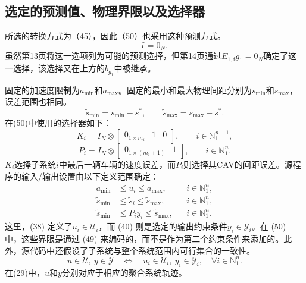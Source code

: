 \documentclass{article}
\begin{document}
\subsection*{选定的预测值、物理界限以及选择器}
所选的转换方式为（45），因此（50）也采用这种预测方式。
\begin{equation}
\hat\epsilon=0_N. \tag{37}
\end{equation}
虽然第13页将这一选项列为可能的预测选择，但第14页通过$E_{1,\mathrm f}g_1=0_N$确定了这一选择，该选择又在上方的$b_{g_1}$中被继承。

固定的加速度限制为$a_{\min}$和$a_{\max}$。固定的最小和最大物理间距分别为$s_{\min}$和$s_{\max}$，误差范围也相同。
\[
\tilde{s}_{\min}=s_{\min}-s^*,\qquad
\tilde{s}_{\max}=s_{\max}-s^*.
\]
在(50)中使用的选择器如下：
\[
K_i=I_N\otimes\begin{bmatrix}0_{1\times m_i}&1&0\end{bmatrix},
\qquad i\in\mathbb N_1^{n-1},
\]
\[
P_i=I_N\otimes\begin{bmatrix}0_{1\times(m_i+1)}&1\end{bmatrix},
\qquad i\in\mathbb N_1^n.
\]
$K_i$选择子系统$i$中最后一辆车辆的速度误差，而$P_i$则选择其CAV的间距误差。源程序的输入/输出设置由以下定义范围确定：
\begin{align}
a_{\min}&\leq u_i\leq a_{\max}, &&i\in\mathbb N_1^n, \tag{38}\\
\tilde{s}_{\min}&\leq\tilde{s}_i\leq\tilde{s}_{\max}, &&i\in\mathbb N_1^n, \tag{39}\\
\tilde{s}_{\min}&\leq P_i y_i\leq\tilde{s}_{\max}, &&i\in\mathbb N_1^n. \tag{40}
\end{align}
这里，(38) 定义了$u_i\in\mathcal U_i$，而 (40) 则是选定的输出约束条件$y_i\in\mathcal Y_i$。在 (50) 中，这些界限是通过 (49) 来编码的，而不是作为第二个约束条件来添加的。此外，源代码中还假设了子系统与整个系统范围内可行集合的一致性。
\begin{equation}
u\in\mathcal U,\ y\in\mathcal Y
\quad\Longleftrightarrow\quad
u_i\in\mathcal U_i,\ y_i\in\mathcal Y_i,
\quad\forall i\in\mathbb N_1^n. \tag{29}
\end{equation}
在(29)中，$u$和$y$分别对应于相应的聚合系统轨迹。
\end{document}
